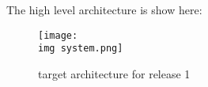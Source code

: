 %

%
%
%
%

The high level \connectx architecture is show here:

\begin{figure}[H]
    \begin{center}
        \texttt{[image: \\img system.png]}
    \end{center}
\caption{\connectx target architecture for release 1}
\label{imgTargetArch}
\end{figure}




